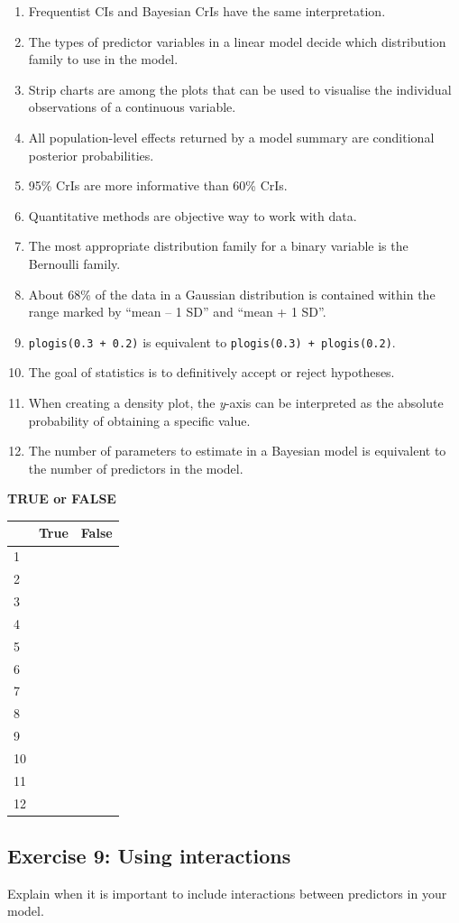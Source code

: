 \documentclass[
]{article}
\providecommand{\tightlist}{%
  \setlength{\itemsep}{0pt}\setlength{\parskip}{0pt}}
\begin{document}
\begin{enumerate}
\def\labelenumi{\arabic{enumi}.}
\tightlist
\item
  Frequentist CIs and Bayesian CrIs have the same interpretation.
\item
  The types of predictor variables in a linear model decide which
  distribution family to use in the model.
\item
  Strip charts are among the plots that can be used to visualise the
  individual observations of a continuous variable.
\item
  All population-level effects returned by a model summary are
  conditional posterior probabilities.
\item
  95\% CrIs are more informative than 60\% CrIs.
\item
  Quantitative methods are objective way to work with data.
\item
  The most appropriate distribution family for a binary variable is the
  Bernoulli family.
\item
  About 68\% of the data in a Gaussian distribution is contained within
  the range marked by ``mean -- 1 SD'' and ``mean + 1 SD''.
\item
  \texttt{plogis(0.3\ +\ 0.2)} is equivalent to
  \texttt{plogis(0.3)\ +\ plogis(0.2)}.
\item
  The goal of statistics is to definitively accept or reject hypotheses.
\item
  When creating a density plot, the \emph{y}-axis can be interpreted as
  the absolute probability of obtaining a specific value.
\item
  The number of parameters to estimate in a Bayesian model is equivalent
  to the number of predictors in the model.
\end{enumerate}

\textbf{TRUE or FALSE}

\begin{longtable}[]{@{}lll@{}}
\toprule()
& True & False \\
\midrule()
\endhead
1 & & \\
2 & & \\
3 & & \\
4 & & \\
5 & & \\
6 & & \\
7 & & \\
8 & & \\
9 & & \\
10 & & \\
11 & & \\
12 & & \\
\bottomrule()
\end{longtable}

\newpage

\hypertarget{exercise-9-using-interactions}{%
\subsection{Exercise 9: Using
interactions}\label{exercise-9-using-interactions}}

Explain when it is important to include interactions between predictors
in your model.
\end{document}
